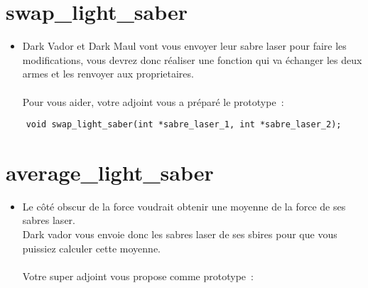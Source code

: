\documentclass{koala-en}
\begin{document}
\chapter{swap\_light\_saber}


\begin{itemize}
	\item	Dark Vador et Dark Maul vont vous envoyer leur sabre laser pour faire les modifications, vous devrez donc réaliser une fonction qui va échanger les deux armes et les renvoyer aux proprietaires.\\\\
		Pour vous aider, votre adjoint vous a préparé le prototype~:
\end{itemize}

\begin{lstlisting}
	void swap_light_saber(int *sabre_laser_1, int *sabre_laser_2);
\end{lstlisting}


\newpage

\chapter{average\_light\_saber}


\begin{itemize}
	\item	Le côté obscur de la force voudrait obtenir une moyenne de la force de ses sabres laser.\\
		Dark vador vous envoie donc les sabres laser de ses sbires pour que vous puissiez calculer cette moyenne.\\\\
		Votre super adjoint vous propose comme prototype~:
\end{itemize}
\end{document}
